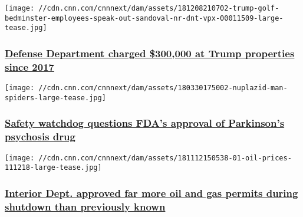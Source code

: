\href{/2019/04/10/politics/defense-department-300000-at-trump-properties/index.html}{}

\texttt{[image: //cdn.cnn.com/cnnnext/dam/assets/181208210702-trump-golf-bedminster-employees-speak-out-sandoval-nr-dnt-vpx-00011509-large-tease.jpg]}

\hypertarget{defense-department-charged-300000-at-trump-properties-since-2017}{%
\subsubsection{\texorpdfstring{\href{/2019/04/10/politics/defense-department-300000-at-trump-properties/index.html}{Defense
Department charged \$300,000 at Trump properties since
2017}}{Defense Department charged \$300,000 at Trump properties since 2017}}\label{defense-department-charged-300000-at-trump-properties-since-2017}}

\href{/2019/03/28/health/nuplazid-ismp-safety-watchdog-report/index.html}{}

\texttt{[image: //cdn.cnn.com/cnnnext/dam/assets/180330175002-nuplazid-man-spiders-large-tease.jpg]}

\hypertarget{safety-watchdog-questions-fdas-approval-of-parkinsons-psychosis-drug-}{%
\subsubsection{\texorpdfstring{\href{/2019/03/28/health/nuplazid-ismp-safety-watchdog-report/index.html}{Safety
watchdog questions FDA's approval of Parkinson's psychosis drug
}}{Safety watchdog questions FDA's approval of Parkinson's psychosis drug }}\label{safety-watchdog-questions-fdas-approval-of-parkinsons-psychosis-drug-}}

\href{/2019/03/27/politics/bernhardt-interior-approved-permits-shutdown/index.html}{}

\texttt{[image: //cdn.cnn.com/cnnnext/dam/assets/181112150538-01-oil-prices-111218-large-tease.jpg]}

\hypertarget{interior-dept-approved-far-more-oil-and-gas-permits-during-shutdown-than-previously-known}{%
\subsubsection{\texorpdfstring{\href{/2019/03/27/politics/bernhardt-interior-approved-permits-shutdown/index.html}{Interior
Dept. approved far more oil and gas permits during shutdown than
previously
known}}{Interior Dept. approved far more oil and gas permits during shutdown than previously known}}\label{interior-dept-approved-far-more-oil-and-gas-permits-during-shutdown-than-previously-known}}

